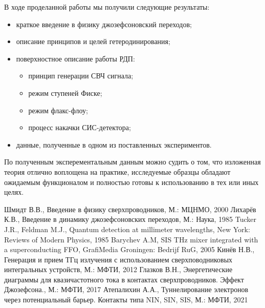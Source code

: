 \documentclass[12pt,a4paper]{article}
\begin{document}
В ходе проделанной работы мы получили следующие результаты:

    \begin{itemize}
        \item краткое введение в физику джозефсоновский переходов;
        \item описание принципов и целей гетеродинирования;
        \item поверхностное описание работы РДП:
                \begin{itemize}
                    \item принцип генерации СВЧ сигнала;
                    \item режим ступеней Фиске;
                    \item режим флакс-флоу;
                    \item процесс накачки СИС-детектора;
                \end{itemize}
        \item данные, полученные в одном из поставленных экспериментов.
    \end{itemize}

По полученным эксперементальным данным можно судить о том, что изложенная теория отлично воплощена на практике, исследуемые образцы обладают ожидаемым функционалом и полностью готовы к использованию в тех или иных целях.

\newpage

\begin{thebibliography}{7}
        Шмидт В.В., Введение в физику сверхпроводников, М.: МЦНМО, 2000
        Лихарёв К.В., Введение в динамику джозефсоновских переходов, М.: Наука, 1985
        Tucker J.R., Feldman M.J., Quantum detection at millimeter wavelengths, New York: Reviews of Modern Physics, 1985
        Barychev A.M, SIS THz mixer integrated with a superconducting FFO,  GrafiMedia Groningen: Bedrijf RuG, 2005
        Кинёв Н.В., Генерация и прием ТГц излучения с использованием сверхповодниковых интегральных устройств, М.: МФТИ, 2012
        Глазков В.Н., Энергетические диаграммы для квазичастотного тока в контактах сверхпроводников. Эффект Джозефсона., М.: МФТИ, 2017
        Атепалихин А.А., Туннелирование электронов через потенциальный барьер. Контакты типа NIN, SIN, SIS, М.: МФТИ, 2021
\end{thebibliography}
\end{document}
